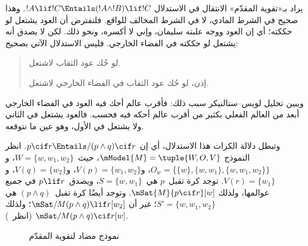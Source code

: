 \documentclass[../../../include/open-logic-section]{subfiles}
\begin{document}


يراد بـ«تقوية المقدّم» الانتقال في الاستدلال
$!A \lif !C \Entails (!A \land !B) \lif !C$. وهذا صحيح في الشرط
المادي، لا في الشرط المخالف للواقع. فلنفترض أن العود يشتعل لو حككته؛
أي إن العود ووجه علبته سليمان، وإني لا أكسره، ونحو ذلك. لكن لا يصدق
أنه يشتعل لو حككته في الفضاء الخارجي. فليس الاستدلال الآتي بصحيح:
\begin{quote}
  لو حُك عود الثقاب لاشتعل.

  إذن، لو حُك عود الثقاب في الفضاء الخارجي لاشتعل.
\end{quote}

ويبين تحليل لويس--ستالنيكر سبب ذلك: فأقرب عالم أحك فيه العود في الفضاء
الخارجي أبعد من العالم الفعلي بكثير من أقرب عالم أحكه فيه فحسب. فالعود
يشتعل في الثاني ولا يشتعل في الأول، وهو عين ما نتوقعه.

\begin{ex}
  وتبطل دلالة الكرات هذا الاستدلال، أي إن
  $p \cif r \Entails/ (p \land q) \cif r$. انظر النموذج
  $\mModel{M} = \tuple{W, O, V}$، حيث~$W = \{w, w_1, w_2\}$،
  و$O_w = \{\{w\}, \{w, w_1\}, \{w, w_1, w_2\}\}$،
  و$V(p) = \{w_1, w_2\}$، و$V(q) = \{w_2\}$،
  و$V(r) = \{w_1\}$. توجد كرة تقبل~$p$ هي~$S = \{w, w_1\}$،
  ويصدق~$p \lif r$ في جميع عوالمها، ولذلك
  $\mSat{M}{p \cif r}[w]$. وتوجد أيضًا كرة تقبل~$(p \land q)$ هي
  $S' = \{w, w_1, w_2\}$؛ غير أن
  $\mSat/{M}{(p \land q) \lif r}[w_2]$؛ ولذلك
  $\mSat/{M}{(p \land q) \cif r}[w]$
  (انظر~).

\begin{figure}
\begin{center}
\caption{نموذج مضاد لتقوية المقدّم}
\end{center}
\end{figure}
\end{ex}
\end{document}

